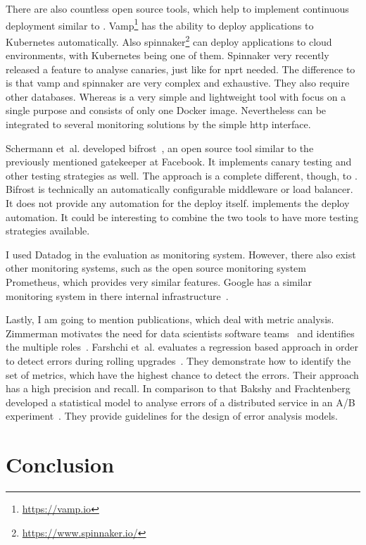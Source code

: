 There are also countless open source tools, which help to implement continuous deployment
similar to \deployer. Vamp\footnote{\url{https://vamp.io}} has the ability to deploy
applications to Kubernetes automatically. Also
spinnaker\footnote{\url{https://www.spinnaker.io/}} can deploy applications to cloud
environments, with Kubernetes being one of them. Spinnaker very recently released a
feature to analyse canaries, just like for \gls{nprt} needed. The difference to \deployer
is that vamp and spinnaker are very complex and exhaustive. They also require other
databases. Whereas \deployer is a very simple and lightweight tool with focus on a single
purpose and consists of only one Docker image. Nevertheless \deployer can be integrated to
several monitoring solutions by the simple http interface.

Schermann et~al. developed bifrost~\cite{bifrost}, an open source tool similar to the
previously mentioned gatekeeper at Facebook. It implements canary testing and other
testing strategies as well. The approach is a complete different, though, to
\deployer. Bifrost is technically an automatically configurable middleware or
load balancer. It does not provide any automation for the deploy itself. \deployer
implements the deploy automation. It could be interesting to combine the two tools to have
more testing strategies available.

I used Datadog in the evaluation as monitoring system. However, there also exist other
monitoring systems, such as the open source monitoring system Prometheus, which provides
very similar features. Google has a similar monitoring system in there internal
infrastructure~\cite{sre_monitoring}.

Lastly, I am going to mention publications, which deal with metric analysis. Zimmerman
motivates the need for data scientists software teams~\cite{data_science_role2} and
identifies the multiple roles~\cite{data_science_role}. Farshchi et~al. evaluates a
regression based approach in order to detect errors during rolling
upgrades~\cite{anomaly_detection}. They demonstrate how to identify the set of metrics,
which have the highest chance to detect the errors. Their approach has a high precision
and recall. In comparison to that Bakshy and Frachtenberg developed a statistical model to
analyse errors of a distributed service in an A/B
experiment~\cite{error_analysis_of_distr_system}. They provide guidelines for the design
of error analysis models.

\chapter{Conclusion}
\label{chap:conclusion}


